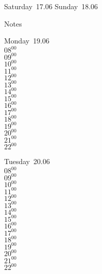 \documentclass[11pt,a4paper]{book}\usepackage[]{graphicx}\usepackage[]{color}
\begin{document}
\begin{weekendbox}
  Saturday~17.06
  \tcblower
  Sunday~18.06
\end{weekendbox} %
\begin{notebox}
  Notes
\end{notebox}
\clearpage
\begin{headerbox}
\end{headerbox}
\begin{weekdaybox}
  Monday~19.06\\
  { 
  \vfill
  $08^{00}$\\
$09^{00}$\\
$10^{00}$\\
$11^{00}$\\
$12^{00}$\\
$13^{00}$\\
$14^{00}$\\
$15^{00}$\\
$16^{00}$\\
$17^{00}$\\
$18^{00}$\\
$19^{00}$\\
$20^{00}$\\
$21^{00}$\\
$22^{00}$\\
  }
\end{weekdaybox}
\begin{weekdaybox}
  Tuesday~20.06\\
  { 
  \vfill
  $08^{00}$\\
$09^{00}$\\
$10^{00}$\\
$11^{00}$\\
$12^{00}$\\
$13^{00}$\\
$14^{00}$\\
$15^{00}$\\
$16^{00}$\\
$17^{00}$\\
$18^{00}$\\
$19^{00}$\\
$20^{00}$\\
$21^{00}$\\
$22^{00}$\\
  }
\end{weekdaybox}
\end{document}
